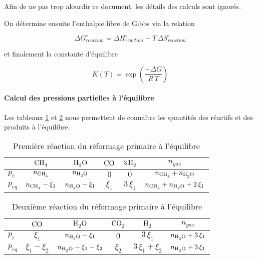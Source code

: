 \documentclass[a4paper, oneside, 12pt]{article}
\begin{document}
Afin de ne pas trop alourdir ce document, les détails des calculs sont ignorés.

On détermine ensuite l'enthalpie libre de Gibbs via la relation 

\begin{equation}
	\Delta G_{reaction}^{\circ} = \Delta H_{reaction}^{\circ} 
	- T \, \Delta S_{reaction}^{\circ}
\end{equation}

et finalement la constante d'équilibre 

\begin{equation}
	K(T) = \exp{\left(\frac{- \Delta G}{R \, T}\right)}
\end{equation}

\paragraph{Calcul des pressions partielles à l'équilibre}

Les tableaux \ref{tab:reaction1_primaire} et \ref{tab:reaction2_primaire} nous 
permettent de conna\^itre les quantités des réactifs et des produits à l'équilibre. 

\begin{table}
	\centering
	\begin{tabular}{l|c|c|c|c|c}
		 & $\ce{CH4}$ & $\ce{H2O}$ & $\ce{CO}$ & $\ce{3H2}$ & $n_{gaz}$ \\
		\hline
		$p_{i}$ & $n_{\ce{CH4}}$ & $n_{\ce{H2O}}$ & $0$ & $0$ &
		$n_{\ce{CH4}} + n_{\ce{H2O}}$ \\
		$p_{eq}$ & $n_{\ce{CH4}} - \xi_1$ & $n_{\ce{H2O}} - \xi_1$ & 
		$\xi_1$ & $3 \, \xi_1$ & $n_{\ce{CH4}} + n_{\ce{H2O}} + 2 \, \xi_1 $\\
	\end{tabular}
	\caption{Première réaction du réformage primaire à l'équilibre}
	\label{tab:reaction1_primaire}
\end{table}

\begin{table}
	\centering
	\begin{tabular}{l|c|c|c|c|c}
		 & $\ce{CO}$ & $\ce{H2O}$ & $\ce{CO2}$ & $\ce{H2}$ & $n_{gaz}$ \\
		\hline
		$p_{i}$ & $\xi_1$ & $n_{\ce{H2O}} - \xi_1$ & $0$ & $3 \, \xi_1$ &
		$n_{\ce{H2O}} + 3 \, \xi_1$ \\
		$p_{eq}$ & $\xi_1 - \xi_2$ & $n_{\ce{H2O}} - \xi_1 - \xi_2$ & 
		$\xi_2$ & $3 \, \xi_1 + \xi_2$ & $n_{\ce{H2O}} + 3 \, \xi_1 $\\
	\end{tabular}
	\caption{Deuxième réaction du réformage primaire à l'équilibre}
	\label{tab:reaction2_primaire}
\end{table}
\end{document}
